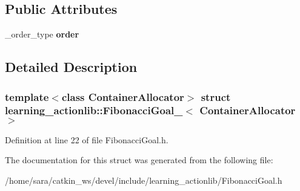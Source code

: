 \subsection*{Public Attributes}
\begin{DoxyCompactItemize}
\item 
\mbox{\label{structlearning__actionlib_1_1FibonacciGoal___a46fb04c5be61ddc4b97d0301d5d2c61e}} 
\+\_\+order\+\_\+type {\bfseries order}
\end{DoxyCompactItemize}


\subsection{Detailed Description}
\subsubsection*{template$<$class Container\+Allocator$>$\newline
struct learning\+\_\+actionlib\+::\+Fibonacci\+Goal\+\_\+$<$ Container\+Allocator $>$}



Definition at line 22 of file Fibonacci\+Goal.\+h.



The documentation for this struct was generated from the following file\+:\begin{DoxyCompactItemize}
\item 
/home/sara/catkin\+\_\+ws/devel/include/learning\+\_\+actionlib/Fibonacci\+Goal.\+h\end{DoxyCompactItemize}
